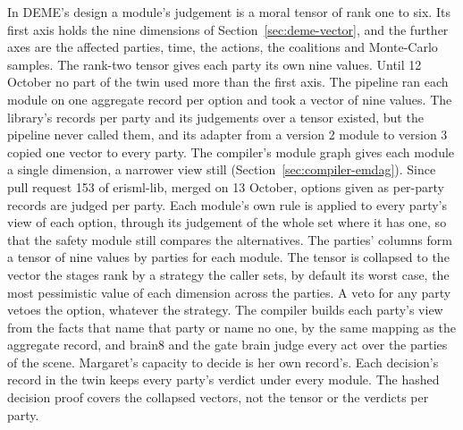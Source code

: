In DEME's design a module's judgement is a moral tensor of rank one to six. Its first axis holds
the nine dimensions of Section~\ref{sec:deme-vector}, and the further axes are the affected
parties, time, the actions, the coalitions and Monte-Carlo samples. The rank-two tensor gives each
party its own nine values.
Until 12 October no part of the twin used more than the first axis. The pipeline ran each module on
one aggregate record per option and took a vector of nine values. The library's records per party
and its judgements over a tensor existed, but the pipeline never called them, and its adapter from
a version 2 module to version 3 copied one vector to every party. The compiler's module graph gives
each module a single dimension, a narrower view still (Section~\ref{sec:compiler-emdag}).
Since pull request 153 of erisml-lib, merged on 13 October, options given as per-party records are
judged per party.
Each module's own rule is applied to every party's view of each option, through its judgement of
the whole set where it has one, so that the safety module still compares the alternatives.
The parties' columns form a tensor of nine values by parties for each module.
The tensor is collapsed to the vector the stages rank by a strategy the caller sets, by default
its worst case, the most pessimistic value of each dimension across the parties. A veto for any
party vetoes the option, whatever the strategy.
The compiler builds each party's view from the facts that name that party or name no one, by the
same mapping as the aggregate record, and brain8 and the gate brain judge every act over the
parties of the scene.
Margaret's capacity to decide is her own record's.
Each decision's record in the twin keeps every party's verdict under every module. The hashed
decision proof covers the collapsed vectors, not the tensor or the verdicts per party.
